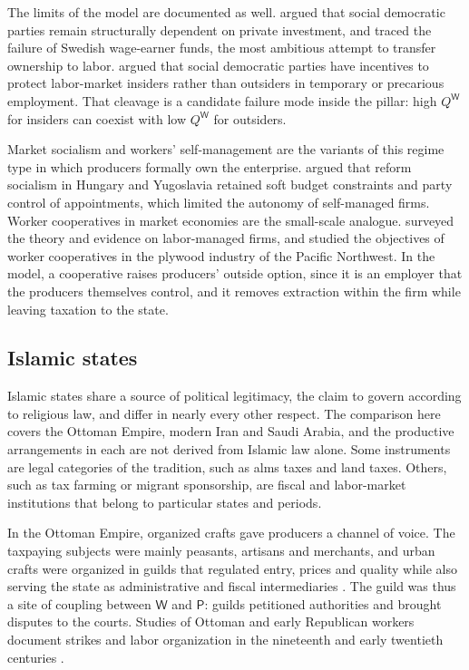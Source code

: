 \documentclass[11pt,letterpaper]{article}
\theoremstyle{definition}
\theoremstyle{remark}
\newcommand{\pP}{\mathsf{P}}
\newcommand{\pW}{\mathsf{W}}
\newcommand{\QW}{Q^{\pW}}
\begin{document}
The limits of the model are documented as well. \citet{przeworski1985} argued that social democratic parties remain structurally dependent on private investment, and \citet{pontusson1992} traced the failure of Swedish wage-earner funds, the most ambitious attempt to transfer ownership to labor. \citet{rueda2005} argued that social democratic parties have incentives to protect labor-market insiders rather than outsiders in temporary or precarious employment. That cleavage is a candidate failure mode inside the pillar: high $\QW$ for insiders can coexist with low $\QW$ for outsiders.

Market socialism and workers' self-management are the variants of this regime type in which producers formally own the enterprise. \citet{kornai1992} argued that reform socialism in Hungary and Yugoslavia retained soft budget constraints and party control of appointments, which limited the autonomy of self-managed firms. Worker cooperatives in market economies are the small-scale analogue. \citet{dow2003} surveyed the theory and evidence on labor-managed firms, and \citet{craig1993} studied the objectives of worker cooperatives in the plywood industry of the Pacific Northwest. In the model, a cooperative raises producers' outside option, since it is an employer that the producers themselves control, and it removes extraction within the firm while leaving taxation to the state.

\subsection{Islamic states}

Islamic states share a source of political legitimacy, the claim to govern according to religious law, and differ in nearly every other respect. The comparison here covers the Ottoman Empire, modern Iran and Saudi Arabia, and the productive arrangements in each are not derived from Islamic law alone. Some instruments are legal categories of the tradition, such as alms taxes and land taxes. Others, such as tax farming or migrant sponsorship, are fiscal and labor-market institutions that belong to particular states and periods.

In the Ottoman Empire, organized crafts gave producers a channel of voice. The taxpaying subjects were mainly peasants, artisans and merchants, and urban crafts were organized in guilds that regulated entry, prices and quality while also serving the state as administrative and fiscal intermediaries \citep{baer1970}. The guild was thus a site of coupling between $\pW$ and $\pP$: guilds petitioned authorities and brought disputes to the courts. Studies of Ottoman and early Republican workers document strikes and labor organization in the nineteenth and early twentieth centuries \citep{quataert1995}.
\end{document}
